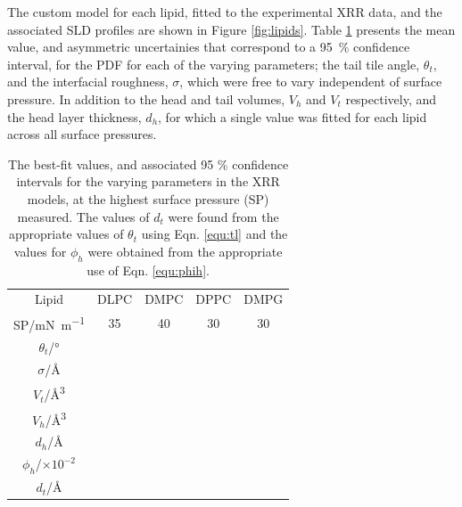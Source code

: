 \documentclass[twocolumn,a4paper]{paper}
\begin{document}
The custom model for each lipid, fitted to the experimental XRR data, and the associated SLD profiles are shown in Figure \ref{fig:lipids}.
Table \ref{tab:liptab} presents the mean value, and asymmetric uncertainies that correspond to a \SI{95}{\percent} confidence interval, for the PDF for each of the varying parameters; the tail tile angle, $\theta_t$, and the interfacial roughness, $\sigma$, which were free to vary independent of surface pressure.
In addition to the head and tail volumes, $V_h$ and $V_t$ respectively, and the head layer thickness, $d_h$, for which a single value was fitted for each lipid across all surface pressures.
%
\begin{table}
  \centering
	\caption{\label{tab:liptab}\small  The best-fit values, and associated 95 \% confidence intervals for the varying parameters in the XRR models, at the highest surface pressure (SP) measured. The values of $d_t$ were found from the appropriate values of $\theta_t$ using Eqn. \ref{equ:tl} and the values for $\phi_h$ were obtained from the appropriate use of Eqn. \ref{equ:phih}.}
	\begin{tabular}{ccccc}
		Lipid & DLPC & DMPC & DPPC & DMPG \\
    SP/\si{\milli\newton\per\meter} & 35 & 40 & 30 & 30 \\
		\hline
		$\theta_t$/\si{\degree} &  &  &  &  \\
		$\sigma$/\si{\angstrom} &  &  &  &  \\
    \hline
    $V_t$/\si{\cubic\angstrom} &  &  &  &  \\
		$V_h$/\si{\cubic\angstrom} &  &  &  &  \\
		$d_h$/\si{\angstrom} &  &  &  &  \\
    \hline
    $\phi_h$/$\times10^{-2}$ &  &  &  &  \\
		$d_t$/\si{\angstrom} &  &  &  &  \\
	\end{tabular}
\end{table}
%
\end{document}
